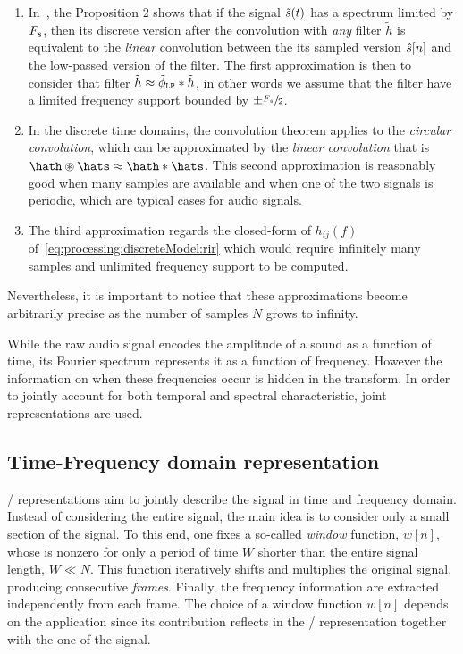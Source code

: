 \begin{enumerate}
    \item\label{en:processing:dft:approx1}
    In~, the Proposition 2 shows that if the signal $\tilde{s}(t)$ has a spectrum limited by $F_s$, then its discrete version after the convolution with \textit{any} filter $\tilde{h}$
    is equivalent to the \textit{linear} convolution between the its sampled version $\hat{s}[n]$ and the low-passed version of the filter.
    The first approximation is then to consider that filter $\tilde{h} \approx \lowpassfilter \convDis \tilde{h}$, in other words
    we assume that the filter have a limited frequency support bounded by $\pm \sfrac{F_s}{2}$.
    \item\label{en:processing:dft:approx2}
    In the discrete time domains, the convolution theorem applies to the \textit{circular convolution}, which can be approximated by the \textit{linear convolution}
    that is $\hath \circledast \hats \approx \hath \convDis \hats$.
    This second approximation is reasonably good when many samples are available and when one of the two signals is periodic, which
    are typical cases for audio signals.
    \item\label{en:processing:dft:approx3}
    The third approximation regards the closed-form of $h_{ij}(f)$ of~\cref{eq:processing:discreteModel:rir} which
    would require infinitely many samples and unlimited frequency support to be computed.
\end{enumerate}

Nevertheless, it is important to notice that these approximations become arbitrarily precise as the number of samples $N$ grows to infinity.

While the raw audio signal encodes the amplitude of a sound as a function of time,
its Fourier spectrum represents it as a function of frequency.
However the information on when these frequencies occur is hidden in the transform.
In order to jointly account for both temporal and spectral characteristic, joint representations are used.

\subsection{Time-Frequency domain representation}
\TFdef/ representations aim to jointly describe the signal in time and frequency domain.
Instead of considering the entire signal, the main idea is to consider only a small section of the signal.
To this end, one fixes a so-called \textit{window} function, $w[n]$, whose is nonzero for only a period of time $W$ shorter than
the entire signal length, $W \ll N$.
This function iteratively shifts and multiplies the original signal, producing consecutive \textit{frames}.
Finally, the frequency information are extracted independently from each frame.
The choice of a window function $w[n]$ depends on the application since its contribution reflects in the \TF/ representation together with the
one of the signal.


